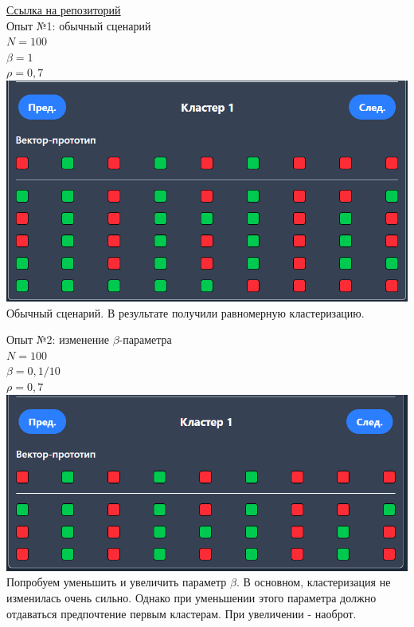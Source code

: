 \documentclass[a4paper,14pt]{extarticle}
\begin{document}
\href{https://github.com/IAmProgrammist/ai_basics/tree/lab2}{Ссылка на репозиторий}\\

Опыт №1: обычный сценарий\\
$N = 100$\\
$\beta = 1$\\
$\rho = 0,7$\\
\includegraphics[width=140mm]{report1}\\
Обычный сценарий. В результате получили равномерную кластеризацию.\bigbreak

Опыт №2: изменение $\beta$-параметра\\
$N = 100$\\
$\beta = 0,1 / 10$\\
$\rho = 0,7$\\
\includegraphics[width=140mm]{report2}\\
Попробуем уменьшить и увеличить параметр $\beta$. В основном, кластеризация не изменилась очень сильно. Однако при уменьшении этого параметра
должно отдаваться предпочтение первым кластерам. При увеличении - наоброт.\bigbreak
\end{document}
